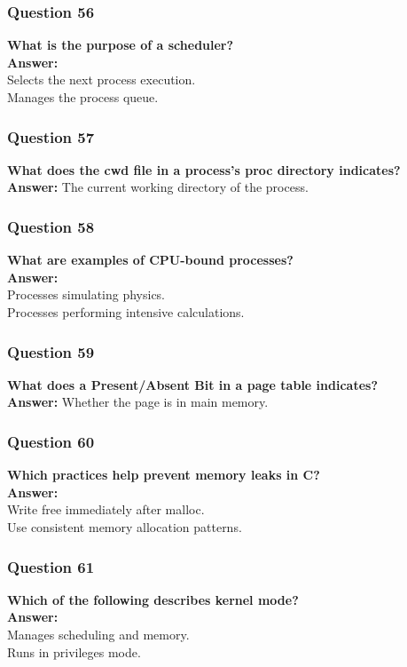 \documentclass{article}
\begin{document}
\subsubsection*{Question 56}
\textbf{What is the purpose of a scheduler?} \\
\textbf{Answer:} \\ 
Selects the next process execution. \\
Manages the process queue.

\subsubsection*{Question 57}
\textbf{What does the cwd file in a process's proc directory indicates?} \\
\textbf{Answer:} The current working directory of the process.

\subsubsection*{Question 58}
\textbf{What are examples of CPU-bound processes?} \\
\textbf{Answer:} \\
Processes simulating physics. \\
Processes performing intensive calculations.

\subsubsection*{Question 59}
\textbf{What does a Present/Absent Bit in a page table indicates?} \\
\textbf{Answer:} Whether the page is in main memory.

\subsubsection*{Question 60}
\textbf{Which practices help prevent memory leaks in C?} \\
\textbf{Answer:} \\
Write free immediately after malloc. \\
Use consistent memory allocation patterns.

\subsubsection*{Question 61}
\textbf{Which of the following describes kernel mode?} \\
\textbf{Answer:} \\
Manages scheduling and memory. \\
Runs in privileges mode.
\end{document}
